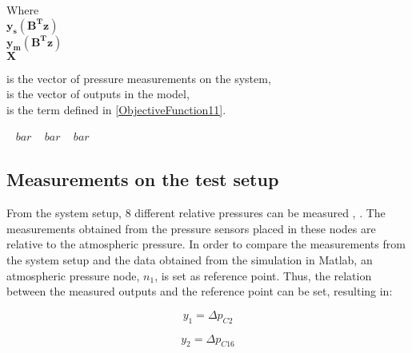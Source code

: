 \begin{minipage}[t]{0.20\textwidth}
Where\\
\hspace*{8mm} $\bm{y_{s}(B^T z)}$ \\
\hspace*{8mm} $\bm{y_{m}(B^T z)}$ \\
\hspace*{8mm} $\mathcal{\bm{X}}$ 
\end{minipage}
\begin{minipage}[t]{0.68\textwidth}
\vspace*{2mm}
is the vector of pressure measurements on the system,\\
is the vector of outputs in the model, \\
is the term defined in \eqref{ObjectiveFunction11}.
\end{minipage}
\begin{minipage}[t]{0.10\textwidth}
\vspace*{2mm}
\textcolor{White}{te}$\unit{bar}$
\textcolor{White}{te}$\unit{bar}$
\textcolor{White}{te}$\unit{bar}$
\end{minipage}
\subsection{Measurements on the test setup}

From the system setup, $8$ different relative pressures can be measured , . The measurements obtained from the pressure sensors 
placed in these nodes are relative to the atmospheric pressure. In order to compare the measurements from the system setup and the data 
obtained from the simulation in Matlab, an atmospheric pressure node, $n_1$, is set as reference point. Thus, the relation between the measured 
outputs and the reference point can be set, resulting in:

\vspace{4mm}
\begin{equation}
    y_1 = \Delta p_{C2} 
\end{equation}

\vspace{4mm}
\begin{equation}
   y_2 = \Delta p_{C16} 
 \end{equation}

